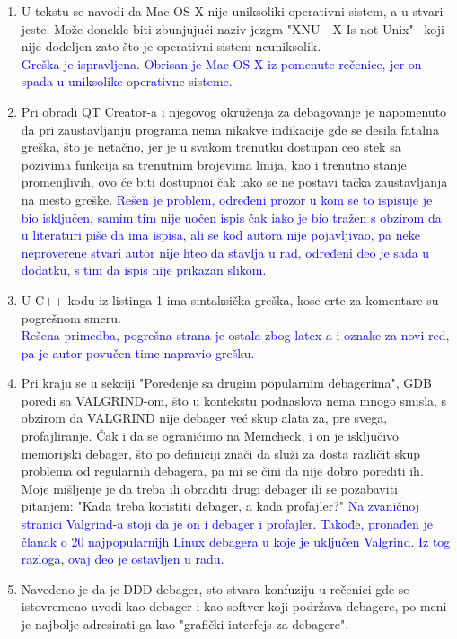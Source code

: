 \documentclass[a4paper]{report}
\newcommand{\odgovor}[1]{\textcolor{blue}{#1}}
\begin{document}
\begin{enumerate}
	\item U tekstu se navodi da Mac OS X nije uniksoliki operativni sistem, a u stvari jeste. Može donekle biti zbunjujući naziv jezgra "XNU - X Is not Unix" \ koji nije dodeljen zato što je operativni sistem neuniksolik.\\
	\odgovor{Greška je ispravljena. Obrisan je Mac OS X iz pomenute rečenice, jer on spada u uniksolike operativne sisteme.}
	\item Pri obradi QT Creator-a i njegovog okruženja za debagovanje je napomenuto da pri zaustavljanju programa nema nikakve indikacije gde se desila fatalna greška, što je netačno, jer je u svakom trenutku dostupan ceo stek sa pozivima funkcija sa trenutnim brojevima linija, kao i trenutno stanje promenjlivih, ovo će biti dostupnoi čak iako se ne postavi tačka zaustavljanja na mesto greške.
	\odgovor{Rešen je problem, određeni prozor u kom se to ispisuje je bio isključen, samim tim nije uočen ispis čak iako je bio tražen s obzirom da u literaturi piše da ima ispisa, ali se kod autora
	nije pojavljivao, pa neke neproverene stvari autor nije hteo da stavlja u rad, određeni deo je sada u dodatku, s tim da ispis nije prikazan slikom.}
           \item U C++ kodu iz listinga 1 ima sintaksička greška, kose crte za komentare su pogrešnom smeru.  \\
	\odgovor{Rešena primedba, pogrešna strana je ostala zbog latex-a i oznake za novi red, pa je autor povučen time napravio grešku.}
	\item Pri kraju se u sekciji "Poređenje sa drugim popularnim debagerima", GDB poredi sa VALGRIND-om, što u kontekstu podnaslova nema mnogo smisla, s obzirom da VALGRIND nije debager već skup alata za, pre svega, profajliranje. Čak i da se ograničimo na Memcheck, i on je isključivo memorijski debager, što po definiciji znači da služi za dosta različit skup problema od regularnih debagera, pa mi se čini da nije dobro porediti ih. Moje mišljenje je da treba ili obraditi drugi debager ili se pozabaviti pitanjem: "Kada treba koristiti debager, a kada profajler?" 
	\odgovor{ Na zvaničnoj stranici Valgrind-a stoji da je on i debager i profajler. Takođe, pronađen je članak o 20 najpopularnijh Linux debagera u koje je uključen Valgrind. Iz tog razloga, ovaj deo je ostavljen u radu.}
	\item Navedeno je da je DDD debager, sto stvara konfuziju u rečenici gde se istovremeno uvodi kao debager i kao softver koji podržava debagere, po meni je najbolje adresirati ga kao "grafički interfejs za debagere". \\

\end{enumerate}
\end{document}
